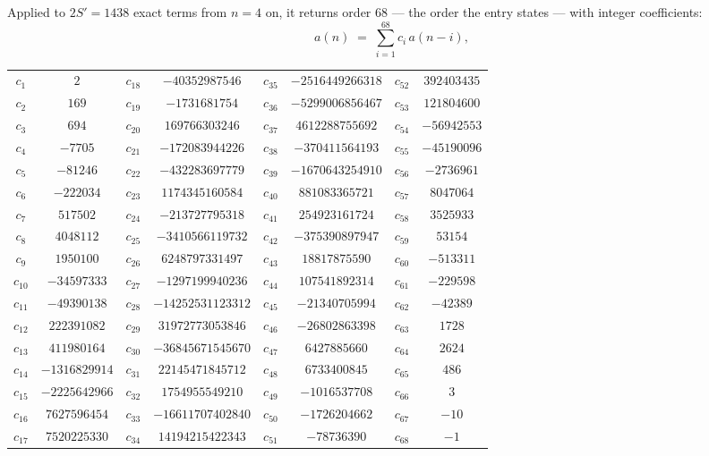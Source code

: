 \documentclass[11pt,a4paper]{article}
\theoremstyle{plain}
\theoremstyle{definition}
\begin{document}
Applied to $2S'=1438$ exact terms from $n=4$ on, it returns order $68$ --- the
order the entry states --- with integer coefficients:
\[
a(n)\;=\;\sum_{i=1}^{68}c_i\,a(n-i),
\]
\begin{center}\small
\begin{tabular}{cccccccc}
$c_{1}$ & $2$ & $c_{18}$ & $-40352987546$ & $c_{35}$ & $-2516449266318$ & $c_{52}$ & $392403435$ \\
$c_{2}$ & $169$ & $c_{19}$ & $-1731681754$ & $c_{36}$ & $-5299006856467$ & $c_{53}$ & $121804600$ \\
$c_{3}$ & $694$ & $c_{20}$ & $169766303246$ & $c_{37}$ & $4612288755692$ & $c_{54}$ & $-56942553$ \\
$c_{4}$ & $-7705$ & $c_{21}$ & $-172083944226$ & $c_{38}$ & $-370411564193$ & $c_{55}$ & $-45190096$ \\
$c_{5}$ & $-81246$ & $c_{22}$ & $-432283697779$ & $c_{39}$ & $-1670643254910$ & $c_{56}$ & $-2736961$ \\
$c_{6}$ & $-222034$ & $c_{23}$ & $1174345160584$ & $c_{40}$ & $881083365721$ & $c_{57}$ & $8047064$ \\
$c_{7}$ & $517502$ & $c_{24}$ & $-213727795318$ & $c_{41}$ & $254923161724$ & $c_{58}$ & $3525933$ \\
$c_{8}$ & $4048112$ & $c_{25}$ & $-3410566119732$ & $c_{42}$ & $-375390897947$ & $c_{59}$ & $53154$ \\
$c_{9}$ & $1950100$ & $c_{26}$ & $6248797331497$ & $c_{43}$ & $18817875590$ & $c_{60}$ & $-513311$ \\
$c_{10}$ & $-34597333$ & $c_{27}$ & $-1297199940236$ & $c_{44}$ & $107541892314$ & $c_{61}$ & $-229598$ \\
$c_{11}$ & $-49390138$ & $c_{28}$ & $-14252531123312$ & $c_{45}$ & $-21340705994$ & $c_{62}$ & $-42389$ \\
$c_{12}$ & $222391082$ & $c_{29}$ & $31972773053846$ & $c_{46}$ & $-26802863398$ & $c_{63}$ & $1728$ \\
$c_{13}$ & $411980164$ & $c_{30}$ & $-36845671545670$ & $c_{47}$ & $6427885660$ & $c_{64}$ & $2624$ \\
$c_{14}$ & $-1316829914$ & $c_{31}$ & $22145471845712$ & $c_{48}$ & $6733400845$ & $c_{65}$ & $486$ \\
$c_{15}$ & $-2225642966$ & $c_{32}$ & $1754955549210$ & $c_{49}$ & $-1016537708$ & $c_{66}$ & $3$ \\
$c_{16}$ & $7627596454$ & $c_{33}$ & $-16611707402840$ & $c_{50}$ & $-1726204662$ & $c_{67}$ & $-10$ \\
$c_{17}$ & $7520225330$ & $c_{34}$ & $14194215422343$ & $c_{51}$ & $-78736390$ & $c_{68}$ & $-1$ \\
\end{tabular}
\end{center}
\end{document}
